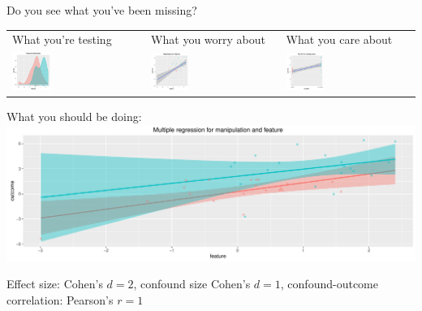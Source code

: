 \documentclass[final]{beamer}
\begin{document}
\begin{frame}{}
\begin{textblock}{48}
\begin{block}{Do you see what you've been missing?}
\begin{center}
\begin{tabular}{l l l }
\centering
What you're testing & What you worry about & What you care about \\
\includegraphics[width=0.3\textwidth]{feature.pdf}  & \includegraphics[width=0.3\textwidth]{feature_regression.pdf} & \includegraphics[width=0.3\textwidth]{anova.pdf} \\
\end{tabular}

What you should be doing:\\
 \includegraphics[width=1\textwidth]{multiple_regression.pdf} 
\end{center}

\tiny
\hfill Effect size: Cohen's $d=2$, confound size Cohen's  $d=1$, confound-outcome correlation: Pearson's $r=1$


\end{block}
\end{textblock}
\end{frame}
\end{document}
